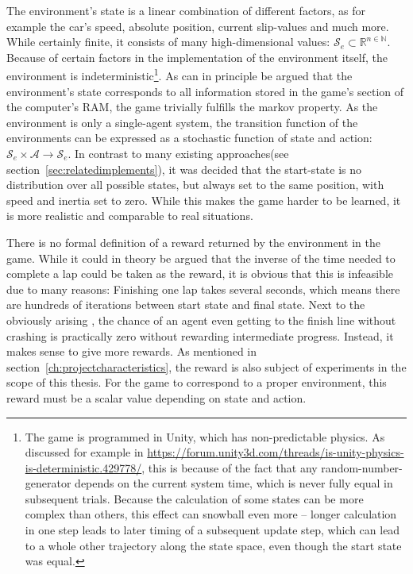 The environment's state is a linear combination of different factors, as for example the car's speed, absolute position, current slip-values and much more. While certainly finite, it consists of many high-dimensional values: $\mathcal{S}_e \subset \mathds{R}^{n \in \mathds{N}}$. Because of certain factors in the implementation of the environment itself, the environment is indeterministic\footnote{The game is programmed in Unity, which has non-predictable physics. As discussed for example in \url{https://forum.unity3d.com/threads/is-unity-physics-is-deterministic.429778/}, this is because of the fact that any random-number-generator depends on the current system time, which is never fully equal in subsequent trials. Because the calculation of some states can be more complex than others, this effect can snowball even more -- longer calculation in one step leads to later timing of a subsequent update step, which can lead to a whole other trajectory along the state space, even though the start state was equal.}. As can in principle be argued that the environment's state corresponds to all information stored in the game's section of the computer's RAM, the game trivially fulfills the markov property. As the environment is only a single-agent system, the transition function of the environments can be expressed as a stochastic function of state and action: $\mathcal{S}_e \times \mathcal{A} \rightarrow \mathcal{S}_e$. 
In contrast to many existing approaches(see section~\ref{sec:relatedimplements}), it was decided that the start-state is no distribution over all possible states, but always set to the same position, with speed and inertia set to zero. While this makes the game harder to be learned, it is more realistic and comparable to real situations.

There is no formal definition of a reward returned by the environment in the game. While it could in theory be argued that the inverse of the time needed to complete a lap could be taken as the reward, it is obvious that this is infeasible due to many reasons: Finishing one lap takes several seconds, which means there are hundreds of iterations between start state and final state. Next to the obviously arising , the chance of an agent even getting to the finish line without crashing is practically zero without rewarding intermediate progress. Instead, it makes sense to give more  rewards. As mentioned in section~\ref{ch:projectcharacteristics}, the reward is also subject of experiments in the scope of this thesis. For the game to correspond to a proper environment, this reward must be a scalar value depending on state and action.

